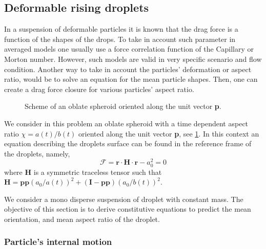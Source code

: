 
\subsection{Deformable rising droplets}

In a suspension of deformable particles it is known that the drag force is a function of the shapes of the drops.
To take in account such parameter in averaged models one usually use a force correlation function of the Capillary or Morton number. 
However, such models are valid in very specific scenario and flow condition. 
Another way to take in account the particles' deformation or aspect ratio, would be to solve an equation for the mean particle shapes. 
Then, one can create a drag force closure for various particles' aspect ratio. 

\begin{figure}[h!]
    \centering
    \hfill
    \hfill
    \caption{Scheme of an  oblate spheroid oriented along the unit vector \textbf{p}.}
    \label{fig:scheme2}
\end{figure}
We consider in this problem an oblate spheroid with a time dependent aspect ratio $\chi = a(t)/b(t)$ oriented along the unit vector \textbf{p}, see \ref{fig:scheme2}.
In this context an equation describing the droplets surface can be found in the reference frame of the droplets, namely, 
\begin{equation}
    \mathscr{F}
    = \textbf{r}\cdot \textbf{H}\cdot \textbf{r} - a_0^2 = 0 
    \label{eq:F_def}
\end{equation}
where \textbf{H} is a symmetric traceless tensor such that $\textbf{H} = \textbf{pp} (a_0/a(t))^2 + (\textbf{I}- \textbf{pp})(a_0/b(t))^2$. 

We consider a mono disperse suspension of droplet with constant mass. 
The objective of this section is to derive constitutive equations to predict the mean orientation, and mean aspect ratio of the droplet. 

\subsubsection{Particle's internal motion}

